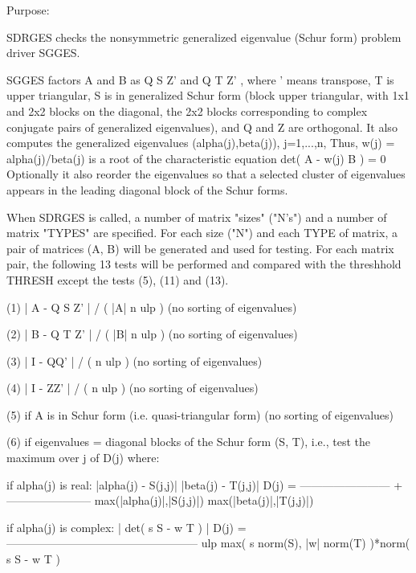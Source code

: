 \begin{DoxyParagraph}{Purpose\+: }
\begin{DoxyVerb} SDRGES checks the nonsymmetric generalized eigenvalue (Schur form)
 problem driver SGGES.

 SGGES factors A and B as Q S Z'  and Q T Z' , where ' means
 transpose, T is upper triangular, S is in generalized Schur form
 (block upper triangular, with 1x1 and 2x2 blocks on the diagonal,
 the 2x2 blocks corresponding to complex conjugate pairs of
 generalized eigenvalues), and Q and Z are orthogonal. It also
 computes the generalized eigenvalues (alpha(j),beta(j)), j=1,...,n,
 Thus, w(j) = alpha(j)/beta(j) is a root of the characteristic
 equation
                 det( A - w(j) B ) = 0
 Optionally it also reorder the eigenvalues so that a selected
 cluster of eigenvalues appears in the leading diagonal block of the
 Schur forms.

 When SDRGES is called, a number of matrix "sizes" ("N's") and a
 number of matrix "TYPES" are specified.  For each size ("N")
 and each TYPE of matrix, a pair of matrices (A, B) will be generated
 and used for testing. For each matrix pair, the following 13 tests
 will be performed and compared with the threshhold THRESH except
 the tests (5), (11) and (13).


 (1)   | A - Q S Z' | / ( |A| n ulp ) (no sorting of eigenvalues)


 (2)   | B - Q T Z' | / ( |B| n ulp ) (no sorting of eigenvalues)


 (3)   | I - QQ' | / ( n ulp ) (no sorting of eigenvalues)


 (4)   | I - ZZ' | / ( n ulp ) (no sorting of eigenvalues)

 (5)   if A is in Schur form (i.e. quasi-triangular form)
       (no sorting of eigenvalues)

 (6)   if eigenvalues = diagonal blocks of the Schur form (S, T),
       i.e., test the maximum over j of D(j)  where:

       if alpha(j) is real:
                     |alpha(j) - S(j,j)|        |beta(j) - T(j,j)|
           D(j) = ------------------------ + -----------------------
                  max(|alpha(j)|,|S(j,j)|)   max(|beta(j)|,|T(j,j)|)

       if alpha(j) is complex:
                                 | det( s S - w T ) |
           D(j) = ---------------------------------------------------
                  ulp max( s norm(S), |w| norm(T) )*norm( s S - w T )


\end{DoxyVerb}
\end{DoxyParagraph}
